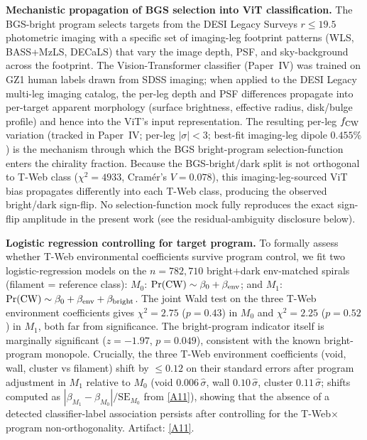 \documentclass[aps,prd,twocolumn,superscriptaddress,showpacs,preprintnumbers,nofootinbib,longbibliography,floatfix]{revtex4-2}
\newcommand{\repoBase}{https://github.com/Hubify-Projects/bigbounce/blob/main}
\begin{document}
\textbf{Mechanistic propagation of BGS selection into ViT classification.}
The BGS-bright program selects targets from the DESI Legacy Surveys
$r\!\le\!19.5$ photometric imaging with a specific set of imaging-leg
footprint patterns (WLS, BASS+MzLS, DECaLS) that vary the image depth,
PSF, and sky-background across the footprint. The Vision-Transformer
classifier (Paper~IV) was trained on GZ1 human labels drawn from SDSS
imaging; when applied to the DESI Legacy multi-leg imaging catalog, the
per-leg depth and PSF differences propagate into per-target apparent
morphology (surface brightness, effective radius, disk/bulge profile)
and hence into the ViT's input representation. The resulting per-leg
$f_{\rm CW}$ variation (tracked in Paper~IV; per-leg $|\sigma|\!<\!3$;
best-fit imaging-leg dipole $0.455\%$) is the mechanism through which
the BGS bright-program selection-function enters the chirality fraction.
Because the BGS-bright/dark split is not orthogonal to T-Web class
($\chi^2 = 4933$, Cram\'{e}r's $V = 0.078$), this imaging-leg-sourced
ViT bias propagates differently into each T-Web class, producing the
observed bright/dark sign-flip. No selection-function mock fully
reproduces the exact sign-flip amplitude in the present work
(see the residual-ambiguity disclosure below).

\textbf{Logistic regression controlling for target program.}
To formally assess whether T-Web environmental coefficients survive
program control, we fit two logistic-regression models on the
$n = 782{,}710$ bright$+$dark env-matched spirals
(filament = reference class):
$M_0$: $\Pr(\rm CW) \sim \beta_0 + \beta_{\rm env}$; and
$M_1$: $\Pr(\rm CW) \sim \beta_0 + \beta_{\rm env} + \beta_{\rm bright}$.
The joint Wald test on the three T-Web environment coefficients gives
$\chi^2 = 2.75$ ($p = 0.43$) in $M_0$ and $\chi^2 = 2.25$ ($p = 0.52$)
in $M_1$, both far from significance. The bright-program indicator
itself is marginally significant ($z = -1.97$, $p = 0.049$), consistent
with the known bright-program monopole. Crucially, the three T-Web
environment coefficients (void, wall, cluster vs filament) shift by
$\leq 0.12$ on their standard errors after program adjustment
in $M_1$ relative to $M_0$ (void $0.006\,\hat\sigma$, wall $0.10\,\hat\sigma$,
cluster $0.11\,\hat\sigma$; shifts computed as $|\beta_{M_1}-\beta_{M_0}|/\mathrm{SE}_{M_0}$
from \href{\repoBase/pipelines/p5\_desi\_chirality/outputs/27\_ext1\_logistic\_program\_control.json}{[A11]}),
showing that the absence of a detected classifier-label association
persists after controlling for the T-Web$\times$program non-orthogonality.
Artifact:
\href{\repoBase/pipelines/p5\_desi\_chirality/outputs/27\_ext1\_logistic\_program\_control.json}{[A11]}.
\end{document}
